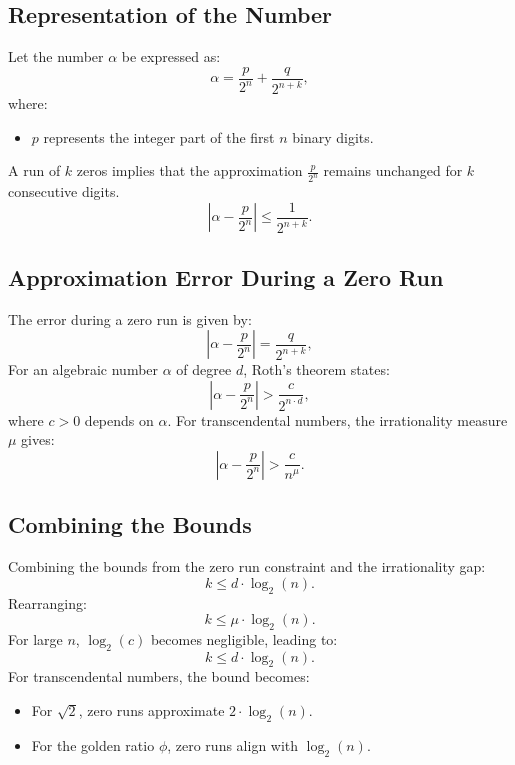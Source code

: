 \subsection{Representation of the Number}
Let the number $\alpha$ be expressed as:
\begin{equation}
    \alpha = \frac{p}{2^n} + \frac{q}{2^{n+k}},
\end{equation}
where:
\begin{itemize}
    \item $p$ represents the integer part of the first $n$ binary digits.
\end{itemize}
A run of $k$ zeros implies that the approximation $\frac{p}{2^n}$ remains unchanged for $k$ consecutive
digits.
\begin{equation}
    \left|\alpha - \frac{p}{2^n}\right| \leq \frac{1}{2^{n+k}}.
\end{equation}

\subsection{Approximation Error During a Zero Run}
The error during a zero run is given by:
\begin{equation}
    \left|\alpha - \frac{p}{2^n}\right| = \frac{q}{2^{n+k}},
\end{equation}
For an algebraic number $\alpha$ of degree $d$, Roth's theorem states:
\begin{equation}
    \left|\alpha - \frac{p}{2^n}\right| > \frac{c}{2^{n \cdot d}},
\end{equation}
where $c > 0$ depends on $\alpha$. For transcendental numbers, the irrationality measure $\mu$
gives:
\begin{equation}
    \left|\alpha - \frac{p}{2^n}\right| > \frac{c}{n^\mu}.
\end{equation}

\subsection{Combining the Bounds}
Combining the bounds from the zero run constraint and the irrationality gap:
\begin{equation}
    k \leq d \cdot \log_2(n).
\end{equation}
Rearranging:
\begin{equation}
    k \leq \mu \cdot \log_2(n).
\end{equation}
For large $n$, $\log_2(c)$ becomes negligible, leading to:
\begin{equation}
    k \leq d \cdot \log_2(n).
\end{equation}
For transcendental numbers, the bound becomes:
\begin{itemize}
    \item For $\sqrt{2}$, zero runs approximate $2 \cdot \log_2(n)$.
    \item For the golden ratio $\phi$, zero runs align with $\log_2(n)$.
\end{itemize}

